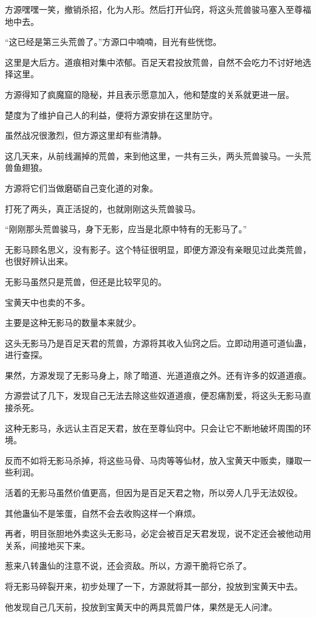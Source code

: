 \begin{this_body}
方源嘿嘿一笑，撤销杀招，化为人形。然后打开仙窍，将这头荒兽骏马塞入至尊福地中去。

“这已经是第三头荒兽了。”方源口中喃喃，目光有些恍惚。

这里是大后方。道痕相对集中浓郁。百足天君投放荒兽，自然不会吃力不讨好地选择这里。

方源得知了疯魔窟的隐秘，并且表示愿意加入，他和楚度的关系就更进一层。

楚度为了维护自己人的利益，便将方源安排在这里防守。

虽然战况很激烈，但方源这里却有些清静。

这几天来，从前线漏掉的荒兽，来到他这里，一共有三头，两头荒兽骏马。一头荒兽鱼翅狼。

方源将它们当做磨砺自己变化道的对象。

打死了两头，真正活捉的，也就刚刚这头荒兽骏马。

“刚刚那头荒兽骏马，身下无影，应当是北原中特有的无影马了。”

无影马顾名思义，没有影子。这个特征很明显，即便方源没有亲眼见过此类荒兽，也很好辨认出来。

无影马虽然只是荒兽，但还是比较罕见的。

宝黄天中也卖的不多。

主要是这种无影马的数量本来就少。

这头无影马乃是百足天君的荒兽，方源将其收入仙窍之后。立即动用道可道仙蛊，进行查探。

果然，方源发现了无影马身上，除了暗道、光道道痕之外。还有许多的奴道道痕。

方源尝试了几下，发现自己无法去除这些奴道道痕，便忍痛割爱，将这头无影马直接杀死。

这种无影马，永远认主百足天君，放在至尊仙窍中。只会让它不断地破坏周围的环境。

反而不如将无影马杀掉，将这些马骨、马肉等等仙材，放入宝黄天中贩卖，赚取一些利润。

活着的无影马虽然价值更高，但因为是百足天君之物，所以旁人几乎无法奴役。

其他蛊仙不是笨蛋，自然不会去收购这样一个麻烦。

再者，明目张胆地外卖这头无影马，必定会被百足天君发现，说不定还会被他动用关系，间接地买下来。

惹来八转蛊仙的注意不说，还会资敌。所以，方源干脆将它杀了。

将无影马碎裂开来，初步处理了一下，方源就将其一部分，投放到宝黄天中去。

他发现自己几天前，投放到宝黄天中的两具荒兽尸体，果然是无人问津。


\end{this_body}
